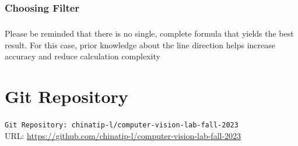 \documentclass[12pt,a4paper]{report}
\begin{document}

\clearpage

\subsection{Choosing Filter}
\paragraph*{}Please be reminded that there is no single, complete formula that yields the best
result. For this case, prior knowledge about the line direction helps increase accuracy and reduce calculation complexity

\appendix
\chapter{Git Repository}

\verb|Git Repository: chinatip-l/computer-vision-lab-fall-2023| \\
URL: \url{https://github.com/chinatip-l/computer-vision-lab-fall-2023}
\end{document}
